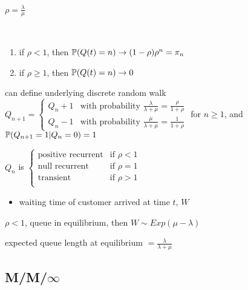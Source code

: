 \begin{fact}
    $\rho = \frac{\lambda}{\mu}$
\end{fact}

\begin{thm}\,
    \begin{enumerate}
        \item if $\rho < 1$, then $\mathbb{P}(Q(t) = n) \rightarrow (1 - \rho)\rho^n = \pi_n$
        \item if $\rho \geq 1$, then $\mathbb{P}(Q(t) = n) \rightarrow 0$
    \end{enumerate}
\end{thm}

\begin{fact}
    can define underlying discrete random walk $Q_{n+1} =
    \begin{cases}
        Q_n + 1 & \text{with probability } \frac{\lambda}{\lambda + \mu} = \frac{\rho}{1 + \rho}\\
        Q_n - 1 & \text{with probability } \frac{\mu}{\lambda + \mu} = \frac{1}{1 + \rho}
    \end{cases}$ for $n \geq 1$, and $\mathbb{P}(Q_{n+1} = 1|Q_n = 0) = 1$
\end{fact}

\begin{fact}
    $Q_n$ is $\begin{cases}
                  \text{positive recurrent} & \text{if } \rho < 1\\
                  \text{null recurrent} & \text{if } \rho = 1\\
                  \text{transient} & \text{if } \rho > 1\\
    \end{cases}$
\end{fact}

\begin{itemize}
    \item waiting time of customer arrived at time $t$, $W$
\end{itemize}

\begin{thm}
    $\rho < 1$, queue in equilibrium, then $W \sim Exp(\mu - \lambda)$
\end{thm}

\begin{fact}
    expected queue length at equilibrium $ = \frac{\lambda}{\lambda + \mu}$
\end{fact}

\subsection{M/M/$\infty$}\label{subsec:m/m/}

